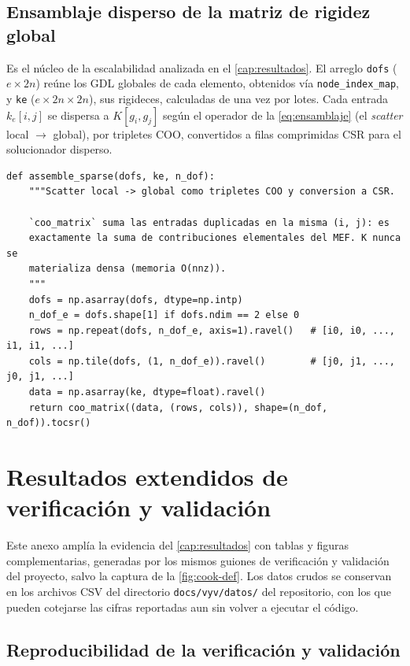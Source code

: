 \section{Ensamblaje disperso de la matriz de rigidez global}

Es el núcleo de la escalabilidad analizada en el \autoref{cap:resultados}. El arreglo \texttt{dofs} ($e\times 2n$) reúne los GDL globales de cada elemento, obtenidos vía \texttt{node\_index\_map}, y \texttt{ke} ($e\times 2n\times 2n$), sus rigideces, calculadas de una vez por lotes. Cada entrada $k_e[i,j]$ se dispersa a $K[g_i, g_j]$ según el operador de la \autoref{eq:ensamblaje} (el \emph{scatter} local $\to$ global), por tripletes COO, convertidos a filas comprimidas CSR para el solucionador disperso.

\begin{lstlisting}
def assemble_sparse(dofs, ke, n_dof):
    """Scatter local -> global como tripletes COO y conversion a CSR.

    `coo_matrix` suma las entradas duplicadas en la misma (i, j): es
    exactamente la suma de contribuciones elementales del MEF. K nunca se
    materializa densa (memoria O(nnz)).
    """
    dofs = np.asarray(dofs, dtype=np.intp)
    n_dof_e = dofs.shape[1] if dofs.ndim == 2 else 0
    rows = np.repeat(dofs, n_dof_e, axis=1).ravel()   # [i0, i0, ..., i1, i1, ...]
    cols = np.tile(dofs, (1, n_dof_e)).ravel()        # [j0, j1, ..., j0, j1, ...]
    data = np.asarray(ke, dtype=float).ravel()
    return coo_matrix((data, (rows, cols)), shape=(n_dof, n_dof)).tocsr()
\end{lstlisting}


\chapter{Resultados extendidos de verificación y validación}
\label{anexo:vyv}

Este anexo amplía la evidencia del \autoref{cap:resultados} con tablas y figuras complementarias, generadas por los mismos guiones de verificación y validación del proyecto, salvo la captura de la \autoref{fig:cook-def}. Los datos crudos se conservan en los archivos CSV del directorio \texttt{docs/vyv/datos/} del repositorio, con los que pueden cotejarse las cifras reportadas aun sin volver a ejecutar el código.

\section{Reproducibilidad de la verificación y validación}
\label{sec:vyv-reproducibilidad}

